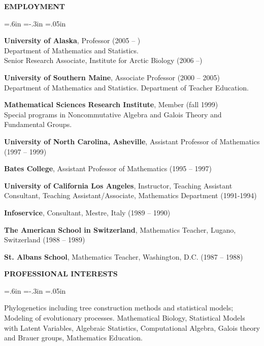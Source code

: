 \documentclass[10pt]{report}
\begin{document}
{\bf EMPLOYMENT}

{\leftskip=.6in  \parindent=-.3in  \parskip=.05in

{\bf University of Alaska}, Professor (2005 --
)\\
Department of Mathematics and Statistics.  \\
Senior Research Associate, Institute for Arctic Biology (2006 --)

{\bf University of Southern Maine}, Associate Professor (2000 -- 2005) \\
\hspace{.9in} Department of Mathematics and Statistics.  Department of
Teacher Education.

{\bf Mathematical Sciences Research Institute}, Member (fall 1999) \\
\hspace{.9in} Special programs in Noncommutative Algebra and Galois
Theory and Fundamental Groups.

{\bf University of North Carolina, Asheville}, Assistant Professor of
Mathematics (1997 -- 1999)

{\bf Bates College}, Assistant Professor of Mathematics (1995 --
1997)

{\bf University of California Los Angeles}, Instructor, Teaching
Assistant Consultant, Teaching Assistant/Associate, Mathematics
Department (1991-1994)

{\bf Infoservice}, Consultant, Mestre, Italy (1989 -- 1990) %

{\bf The American School in Switzerland}, Mathematics Teacher, Lugano, Switzerland
(1988 -- 1989)

{\bf St. Albans School}, Mathematics Teacher, Washington, D.C.
(1987 -- 1988)

\mbox{}
}

{\bf PROFESSIONAL INTERESTS}


{ \leftskip=.6in \parindent=-.3in  \parskip=.05in

  Phylogenetics including tree construction methods and statistical
  models; Modeling of evolutionary processes. Mathematical Biology,
  Statistical Models with Latent Variables, 
  Algebraic Statistics, Computational Algebra, Galois theory and
  Brauer groups, Mathematics Education.

\mbox{}
}
\end{document}
